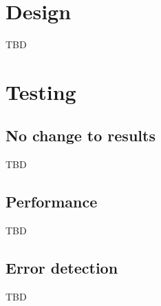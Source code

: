 \documentclass[11pt]{report}
\begin{document}
%
%
\chapter{Design}

TBD


%
%
\chapter{Testing}

\section{No change to results}

TBD

\section{Performance}

TBD

\section{Error detection}

TBD

\end{document}
